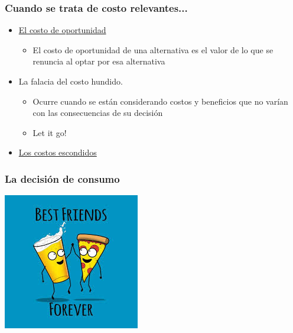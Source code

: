 \documentclass{beamer}
\begin{document}
\begin{frame}
\frametitle{ Cuando se trata de costo relevantes... }
\begin{itemize}
    \item  \href{https://econ.video/2017/08/28/the-simpsons-opportunity-cost-of-lines/}{El costo de oportunidad}
    \begin{itemize}
        \item El costo de oportunidad de una alternativa es el valor de lo que se renuncia al optar por esa alternativa
    \end{itemize}
    \vspace{2mm}
    \item La falacia del costo hundido.  
    \begin{itemize}
        \item Ocurre cuando se están considerando costos y beneficios que no varían con las consecuencias de su decisión
        \item Let it go!
    \end{itemize}
    \vspace{2mm}
    \item \href{https://www.goodfood.com.au/eat-out/good-food-guides/the-surprising-costs-of-running-a-restaurant-20180327-h0y23c}{Los costos escondidos} 
    \vspace{2mm}
\end{itemize} 
\end{frame}


\begin{frame}
\frametitle{La decisión de consumo}
\centering
\includegraphics[scale=0.9]{Figures/Tema_02.1_pizzabirra.jpg}
\end{frame}
\end{document}
